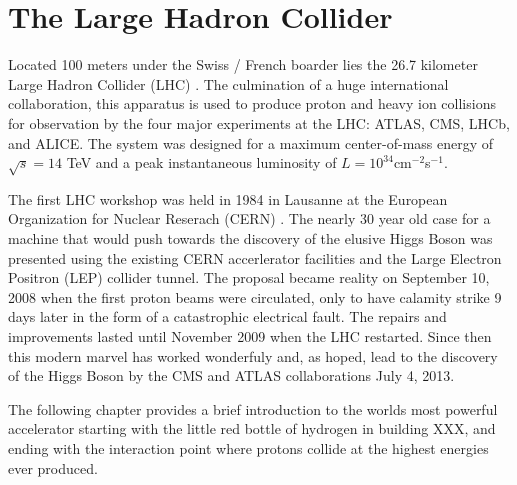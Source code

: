 \chapter{The Large Hadron Collider} \label{chap:lhc}

Located 100 meters under the Swiss / French boarder lies the 26.7 kilometer
Large Hadron Collider (LHC) \cite{Evans:2008zzb}.  The culmination of a huge international collaboration,
this apparatus is used to produce proton and heavy ion collisions for observation by
the four major experiments at the LHC: ATLAS, CMS, LHCb, and ALICE.  The system
was designed for a maximum center-of-mass  energy of $\sqrt{s} = 14$ TeV and a peak
instantaneous luminosity of $L = 10^{34} $cm$^{-2} $s$^{-1}$.  

The first LHC workshop was held in 1984 in Lausanne at the European Organization
for  Nuclear Reserach (CERN) \cite{LlewellynSmith:2014lmn}.  The nearly 30 year
old case for a machine that would push towards the discovery of the elusive
Higgs Boson was presented using the existing CERN accerlerator facilities and
the Large Electron Positron (LEP) collider tunnel. The proposal became reality
on September 10, 2008 when the first proton beams were circulated, only to have
calamity strike 9 days later in the form of a catastrophic electrical fault. The
repairs and improvements lasted until November 2009 when the LHC restarted.
Since then this modern marvel has worked wonderfuly and, as hoped, lead to the
discovery of the Higgs Boson by the CMS and ATLAS collaborations July 4, 2013.

The following  chapter provides a brief introduction to the worlds
most powerful accelerator starting with the little red bottle of hydrogen in 
building XXX, and ending with the interaction point where protons collide at the 
highest energies ever produced.





